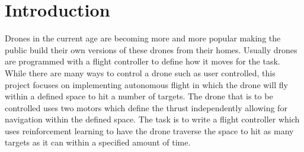 \section{Introduction}
Drones in the current age are becoming more and more popular making the public build their own versions of these drones from their homes. Usually drones are programmed with a flight controller to define how it moves for the task. While there are many ways to control a drone such as user controlled, this project focuses on implementing autonomous flight in which the drone will fly within a defined space to hit a number of targets. The drone that is to be controlled uses two motors which define the thrust independently allowing for navigation within the defined space. The task is to write a flight controller which uses reinforcement learning to have the drone traverse the space to hit as many targets as it can within a specified amount of time.

